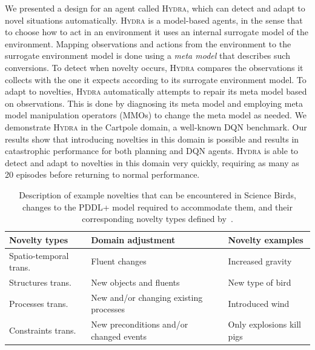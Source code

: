 \documentclass[sigconf]{aamas}
\newcommand{\sbirds}{Science Birds\xspace} %
\newcommand{\hydra}{\textsc{Hydra}\xspace} %
\begin{document}
We presented a design for an agent called \hydra, which can detect and adapt to novel situations automatically. 
\hydra is a model-based agents, in the sense that to choose how to act in an environment it uses an internal surrogate model of the environment. Mapping observations and actions from the environment to the surrogate environment model is done using a \emph{meta model} that describes such conversions. 
To detect when novelty occurs, \hydra compares the observations it collects with the one it expects according to its surrogate environment model.
To adapt to novelties, \hydra automatically attempts to repair its meta model based on observations. 
This is done by diagnosing its meta model and employing meta model manipulation operators (MMOs) to change the meta model as needed. 
We demonstrate \hydra in the Cartpole domain, a well-known DQN benchmark.
Our results show that introducing novelties in this domain is possible and results in catastrophic performance for both planning and DQN agents. 
\hydra is able to detect and adapt to novelties in this domain very quickly, requiring as many as 20 episodes before returning to normal performance. 







\begin{table}[tbh!]
	\centering
	\footnotesize
	\begin{tabular}{p{} | p{} | p{}}
		\hline
		\textbf{Novelty types} & \textbf{Domain adjustment} & \textbf{Novelty examples} \\
		\hline
		Spatio-temporal trans. & Fluent changes & Increased gravity \\
		Structures trans. & New objects and fluents & New type of bird \\
		Processes trans. & New and/or changing existing processes & Introduced wind \\
		Constraints trans. & New preconditions and/or changed events & Only explosions kill pigs \\
		
		\hline
	\end{tabular}
	\caption{Description of example novelties that can be encountered in \sbirds, changes to the PDDL+ model required to accommodate them, and their corresponding novelty types  defined by~\protect\cite{langley2020open}.} %
	\vspace{-0.4cm}
	\label{tab:novelties_pddl}
\end{table}
\end{document}
